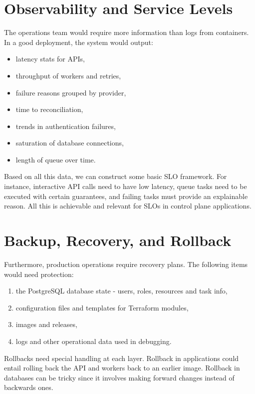 \section{Observability and Service Levels}
The operations team would require more information than logs from containers. In a good deployment, the system would output:
 

\begin{itemize}
    \item latency stats for APIs,
    \item throughput of workers and retries,
    \item failure reasons grouped by provider,
    \item time to reconciliation,
    \item trends in authentication failures,
    \item saturation of database connections,
    \item length of queue over time.
\end{itemize}

Based on all this data, we can construct some basic SLO framework. For instance, interactive API calls need to have low latency, queue tasks need to be executed with certain guarantees, and failing tasks must provide an explainable reason. All this is achievable and relevant for SLOs in control plane applications.

\section{Backup, Recovery, and Rollback}
Furthermore, production operations require recovery plans. The following items would need protection:





\begin{enumerate}
    \item the PostgreSQL database state - users, roles, resources and task info,
    \item configuration files and templates for Terraform modules,
    \item images and releases,
    \item logs and other operational data used in debugging.
\end{enumerate}

Rollbacks need special handling at each layer. Rollback in applications could entail rolling back the API and workers back to an earlier image. Rollback in databases can be tricky since it involves making forward changes instead of backwards ones.

